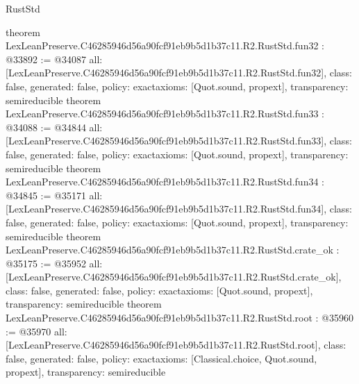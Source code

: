\begin{lexlean}{RustStd}
\begin{coremodule}
{}
theorem LexLeanPreserve.C46285946d56a90fcf91eb9b5d1b37c11.R2.RustStd.fun32 : @33892 := @34087 {
  all: [LexLeanPreserve.C46285946d56a90fcf91eb9b5d1b37c11.R2.RustStd.fun32],
  class: false,
  generated: false,
  policy: exact{axioms: [Quot.sound, propext]},
  transparency: semireducible
}
theorem LexLeanPreserve.C46285946d56a90fcf91eb9b5d1b37c11.R2.RustStd.fun33 : @34088 := @34844 {
  all: [LexLeanPreserve.C46285946d56a90fcf91eb9b5d1b37c11.R2.RustStd.fun33],
  class: false,
  generated: false,
  policy: exact{axioms: [Quot.sound, propext]},
  transparency: semireducible
}
theorem LexLeanPreserve.C46285946d56a90fcf91eb9b5d1b37c11.R2.RustStd.fun34 : @34845 := @35171 {
  all: [LexLeanPreserve.C46285946d56a90fcf91eb9b5d1b37c11.R2.RustStd.fun34],
  class: false,
  generated: false,
  policy: exact{axioms: [Quot.sound, propext]},
  transparency: semireducible
}
theorem LexLeanPreserve.C46285946d56a90fcf91eb9b5d1b37c11.R2.RustStd.crate_ok : @35175 := @35952 {
  all: [LexLeanPreserve.C46285946d56a90fcf91eb9b5d1b37c11.R2.RustStd.crate_ok],
  class: false,
  generated: false,
  policy: exact{axioms: [Quot.sound, propext]},
  transparency: semireducible
}
theorem LexLeanPreserve.C46285946d56a90fcf91eb9b5d1b37c11.R2.RustStd.root : @35960 := @35970 {
  all: [LexLeanPreserve.C46285946d56a90fcf91eb9b5d1b37c11.R2.RustStd.root],
  class: false,
  generated: false,
  policy: exact{axioms: [Classical.choice, Quot.sound, propext]},
  transparency: semireducible
}


\end{coremodule}
\end{lexlean}
